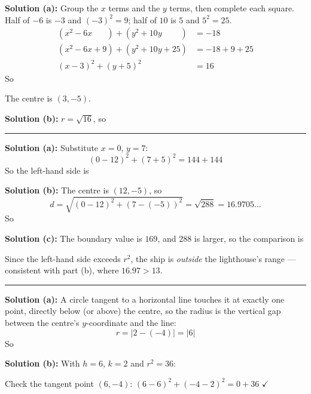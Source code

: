 \documentclass[12pt]{article}
\begin{document}

\textbf{Solution (a):} Group the $x$ terms and the $y$ terms, then complete each square. Half of $-6$ is $-3$ and $(-3)^2 = 9$; half of $10$ is $5$ and $5^2 = 25$.
\begin{align*}
  (x^2 - 6x \phantom{{}+9}) + (y^2 + 10y \phantom{{}+25}) &= -18 \\
  (x^2 - 6x + 9) + (y^2 + 10y + 25) &= -18 + 9 + 25 \\
  (x - 3)^2 + (y + 5)^2 &= 16
\end{align*}
So 

The centre is $(3, -5)$.

\textbf{Solution (b):} $r = \sqrt{16}$, so 

\vspace{0.2cm}\noindent\rule{\linewidth}{0.2pt}


\textbf{Solution (a):} Substitute $x = 0$, $y = 7$:
\[ (0 - 12)^2 + (7 + 5)^2 = 144 + 144 \]
So the left-hand side is 

\textbf{Solution (b):} The centre is $(12, -5)$, so
\[ d = \sqrt{(0-12)^2 + (7-(-5))^2} = \sqrt{288} = 16.9705\ldots \]
So 

\textbf{Solution (c):} The boundary value is $169$, and $288$ is larger, so the comparison is \ans{>}

Since the left-hand side exceeds $r^2$, the ship is \emph{outside} the lighthouse's range --- consistent with part (b), where $16.97 > 13$.

\vspace{0.2cm}\noindent\rule{\linewidth}{0.2pt}


\textbf{Solution (a):} A circle tangent to a horizontal line touches it at exactly one point, directly below (or above) the centre, so the radius is the vertical gap between the centre's $y$-coordinate and the line:
\[ r = |2 - (-4)| = |6| \]
So 

\textbf{Solution (b):} With $h = 6$, $k = 2$ and $r^2 = 36$: 

Check the tangent point $(6, -4)$: $(6-6)^2 + (-4-2)^2 = 0 + 36$ $\checkmark$
\end{document}
